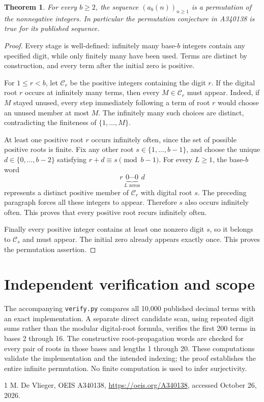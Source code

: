\documentclass[10pt]{article}
\newtheorem{theorem}{Theorem}
\begin{document}
\begin{theorem}
For every $b\ge2$, the sequence $(a_b(n))_{n\ge1}$ is a permutation
of the nonnegative integers. In particular the permutation
conjecture in A340138 is true for its published sequence.
\end{theorem}
\begin{proof}
Every stage is well-defined: infinitely many base-$b$ integers
contain any specified digit, while only finitely many have been
used. Terms are distinct by construction, and every term after
the initial zero is positive.

For $1\le r<b$, let $\mathcal C_r$ be the positive integers
containing the digit $r$. If the digital root $r$ occurs at
infinitely many terms, then every $M\in\mathcal C_r$ must appear.
Indeed, if $M$ stayed unused, every step immediately following
a term of root $r$ would choose an unused member at most $M$.
The infinitely many such choices are distinct, contradicting
the finiteness of $\{1,\ldots,M\}$.

At least one positive root $r$ occurs infinitely often, since
the set of possible positive roots is finite. Fix any other
root $s\in\{1,\ldots,b-1\}$, and choose the unique
$d\in\{0,\ldots,b-2\}$ satisfying
$r+d\equiv s\pmod{b-1}$. For every $L\ge1$, the base-$b$ word
\[
 r\,\underbrace{0\cdots0}_{L\text{ zeros}}\,d
\]
represents a distinct positive member of $\mathcal C_r$ with
digital root $s$. The preceding paragraph forces all these
integers to appear. Therefore $s$ also occurs infinitely often.
This proves that every positive root recurs infinitely often.

Finally every positive integer contains at least one nonzero
digit $s$, so it belongs to $\mathcal C_s$ and must appear.
The initial zero already appears exactly once. This proves the
permutation assertion.
\end{proof}

\section{Independent verification and scope}
The accompanying \texttt{verify.py} compares all 10,000 published
decimal terms with an exact implementation. A separate direct
candidate scan, using repeated digit sums rather than the modular
digital-root formula, verifies the first 200 terms in bases 2
through 16. The constructive root-propagation words are checked
for every pair of roots in those bases and lengths 1 through 20.
These computations validate the implementation and the intended
indexing; the proof establishes the entire infinite permutation.
No finite computation is used to infer surjectivity.

\begin{thebibliography}{1}
 M. De Vlieger, OEIS A340138,
\url{https://oeis.org/A340138}, accessed October 26, 2026.
\end{thebibliography}
\end{document}
